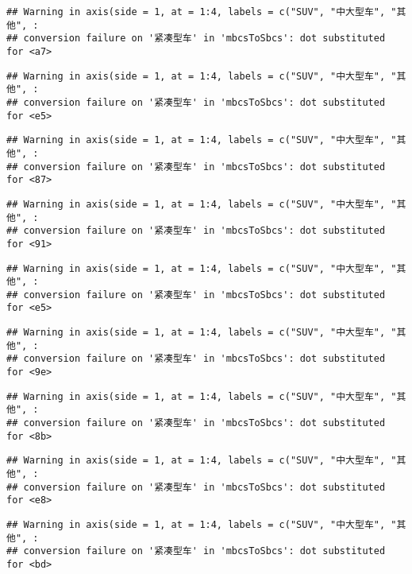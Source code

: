 \documentclass[]{article}
\begin{document}
\begin{verbatim}
## Warning in axis(side = 1, at = 1:4, labels = c("SUV", "中大型车", "其他", :
## conversion failure on '紧凑型车' in 'mbcsToSbcs': dot substituted for <a7>
\end{verbatim}

\begin{verbatim}
## Warning in axis(side = 1, at = 1:4, labels = c("SUV", "中大型车", "其他", :
## conversion failure on '紧凑型车' in 'mbcsToSbcs': dot substituted for <e5>
\end{verbatim}

\begin{verbatim}
## Warning in axis(side = 1, at = 1:4, labels = c("SUV", "中大型车", "其他", :
## conversion failure on '紧凑型车' in 'mbcsToSbcs': dot substituted for <87>
\end{verbatim}

\begin{verbatim}
## Warning in axis(side = 1, at = 1:4, labels = c("SUV", "中大型车", "其他", :
## conversion failure on '紧凑型车' in 'mbcsToSbcs': dot substituted for <91>
\end{verbatim}

\begin{verbatim}
## Warning in axis(side = 1, at = 1:4, labels = c("SUV", "中大型车", "其他", :
## conversion failure on '紧凑型车' in 'mbcsToSbcs': dot substituted for <e5>
\end{verbatim}

\begin{verbatim}
## Warning in axis(side = 1, at = 1:4, labels = c("SUV", "中大型车", "其他", :
## conversion failure on '紧凑型车' in 'mbcsToSbcs': dot substituted for <9e>
\end{verbatim}

\begin{verbatim}
## Warning in axis(side = 1, at = 1:4, labels = c("SUV", "中大型车", "其他", :
## conversion failure on '紧凑型车' in 'mbcsToSbcs': dot substituted for <8b>
\end{verbatim}

\begin{verbatim}
## Warning in axis(side = 1, at = 1:4, labels = c("SUV", "中大型车", "其他", :
## conversion failure on '紧凑型车' in 'mbcsToSbcs': dot substituted for <e8>
\end{verbatim}

\begin{verbatim}
## Warning in axis(side = 1, at = 1:4, labels = c("SUV", "中大型车", "其他", :
## conversion failure on '紧凑型车' in 'mbcsToSbcs': dot substituted for <bd>
\end{verbatim}
\end{document}
